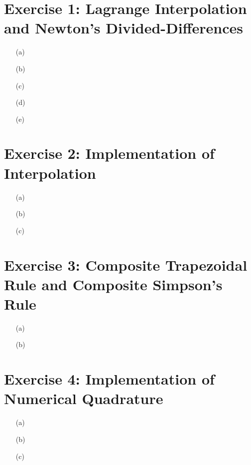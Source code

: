 \documentclass[unicode,11pt,a4paper,oneside,numbers=endperiod,openany]{scrartcl}
\begin{document}
\setassignment
{}

\section*{Exercise 1: Lagrange Interpolation and Newton's Divided-Differences}
\begin{enumerate}
	\item[(a)] 
	\item[(b)]
	\item[(c)]
	\item[(d)]
	\item[(e)] 
\end{enumerate}

\section*{Exercise 2: Implementation of Interpolation}
\begin{enumerate}
	\item[(a)]  
	\item[(b)]
	\item[(c)]
\end{enumerate}

\section*{Exercise 3: Composite Trapezoidal Rule and Composite Simpson's Rule}
\begin{enumerate}
	\item[(a)]
	\item[(b)]
\end{enumerate}

\section*{Exercise 4: Implementation of Numerical Quadrature}
\begin{enumerate}
	\item[(a)]
	\item[(b)]
	\item[(c)]
\end{enumerate}
\end{document}
